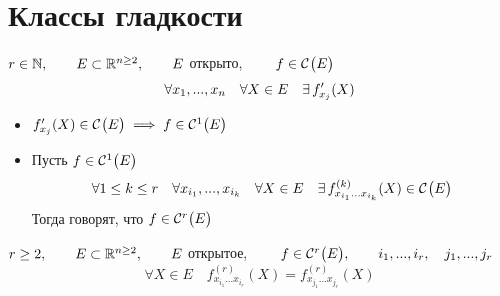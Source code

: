 \section{Классы гладкости}

\begin{definition}
	$ r \in \N, \qquad E \sub \R^{n \ge 2}, \qquad E $ открыто, $ \qquad f \in \Cont{E} $
	$$ \forall x_1, ..., x_n \quad \forall X \in E \quad \exist f_{x_j}'(X) $$
	\begin{itemize}
		\item $ f_{x_j}'(X) \in \Cont{E} \implies f \in \Cont[1]{E} $
		\item Пусть $ f \in \Cont[1]{E} $
		$$ \forall 1 \le k \le r \quad \forall x_{i_1}, ..., x_{i_k} \quad \forall X \in E \quad \exist f_{x_{i_1}...x_{i_k}}^{(k)}(X) \in \Cont{E} $$
		Тогда говорят, что $ f \in \Cont[r]{E} $
	\end{itemize}
\end{definition}

\begin{theorem}
	$ r \ge 2, \qquad E \sub \R^{n \ge 2}, \qquad E $ открытое, $ \qquad f \in \Cont[r]{E}, \qquad i_1, ..., i_r, \quad j_1, ..., j_r $
	$$ \forall X \in E \quad f_{x_{i_1}...x_{i_r}}^{(r)}(X) = f_{x_{j_1}...x_{j_r}}^{(r)}(X) $$
\end{theorem}

